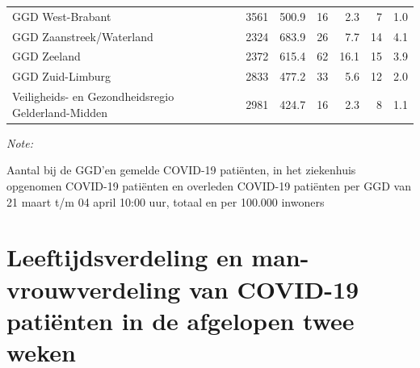 \documentclass[
  english,
  man,floatsintext]{apa6}
\begin{document}
\begin{table}
\begin{threeparttable}
\begin{tabular}{lrrrrrr}
GGD West-Brabant & 3561 & 500.9 & 16 & 2.3 & 7 & 1.0\\
GGD Zaanstreek/Waterland & 2324 & 683.9 & 26 & 7.7 & 14 & 4.1\\
GGD Zeeland & 2372 & 615.4 & 62 & 16.1 & 15 & 3.9\\
GGD Zuid-Limburg & 2833 & 477.2 & 33 & 5.6 & 12 & 2.0\\
Veiligheids- en Gezondheidsregio Gelderland-Midden & 2981 & 424.7 & 16 & 2.3 & 8 & 1.1\\
\bottomrule
\end{tabular}
\begin{tablenotes}
\item \textit{Note: } 
\item Aantal bij de GGD’en gemelde COVID-19 patiënten, in het ziekenhuis opgenomen COVID-19 patiënten en overleden COVID-19 patiënten per GGD van 21 maart t/m 04 april 10:00 uur, totaal en per 100.000 inwoners
\end{tablenotes}
\end{threeparttable}
\endgroup{}
\end{table}

\newpage

\hypertarget{leeftijdsverdeling-en-man-vrouwverdeling-van-covid-19-patiuxebnten-in-de-afgelopen-twee-weken}{%
\section{Leeftijdsverdeling en man-vrouwverdeling van COVID-19 patiënten in de afgelopen twee weken}\label{leeftijdsverdeling-en-man-vrouwverdeling-van-covid-19-patiuxebnten-in-de-afgelopen-twee-weken}}
\end{document}
